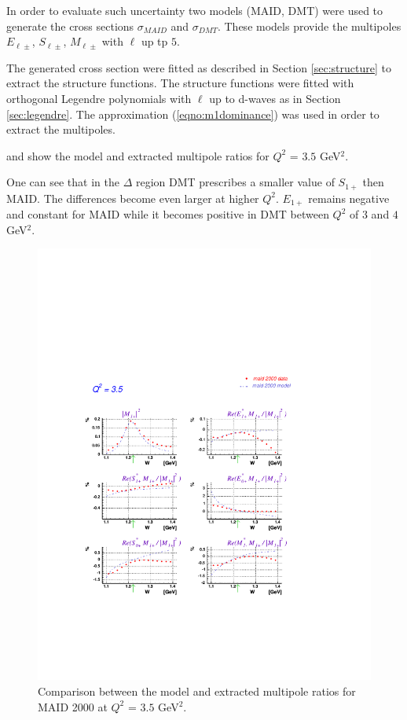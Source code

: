 In order to evaluate such uncertainty
two models (MAID, DMT) were used to generate the cross sections $\sigma_{MAID}$ and $\sigma_{DMT}$.
These models provide the multipoles $E_{\ell\pm}$, $S_{\ell\pm}$, $M_{\ell\pm}$ with $\ell$ up tp $5$.

The generated cross section were fitted as described in Section \ref{sec:structure} to extract
the structure functions. The structure functions were fitted
with orthogonal Legendre polynomials with $\ell$ up to d-waves as in Section \ref{sec:legendre}.
The approximation (\ref{eqno:m1dominance}) was used in order to extract the multipoles.

 and  show the model and extracted multipole ratios for 
$Q^2$ = $3.5$ GeV$^2$.

One can see that in the $\Delta$ region DMT prescribes a smaller 
value of $S_{1+}$ then MAID.  The differences become even larger at higher $Q^2$.
$E_{1+}$ remains negative and constant for MAID while it becomes positive in DMT between $Q^2$ of $3$ and $4$
GeV$^2$.
\begin{figure}[h]
 \begin{center}
 \includegraphics[width = 15cm, bb=30 130 500 600]{analysis/img/multipoles_q2_3.5_data1}
  \caption[Comparison between the model (dashed blue line) and extracted (red points) multipole ratios for MAID 2000]
          { Comparison between the model and extracted multipole ratios for MAID 2000 at $Q^2$ = $3.5$ GeV$^2$.}
 \label{fig:maid_comp}
 \end{center}
\end{figure}

